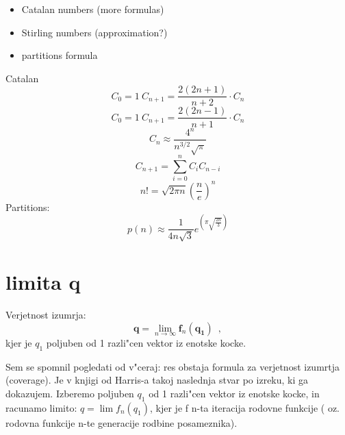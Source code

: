 \documentclass{article}
\begin{document}
    \begin{itemize}	
        \item Catalan numbers (more formulas)
        \item Stirling numbers  (approximation?)
        \item partitions formula 
    \end{itemize}	
   Catalan \\
   \[ C_0 = 1 \ C_{n+1} = \frac{2(2n+1)}{n+2} \cdot C_{n} \]
   \[ C_0 = 1 \ C_{n+1} = \frac{2(2n-1)}{n+1} \cdot C_{n} \]
   \[ C_n \approx \frac{4^n}{n^{3/2}\sqrt{\pi}} \]
   \[ C_{n+1} = \sum_{i=0}^{n} C_i C_{n-i} \]
   \[ n! =  \sqrt{2\pi n} (\frac{n}{e})^n  \]
   Partitions:\\
    \[ p(n) \approx 
     \frac{1}{4n\sqrt{3}}
      e^{(\pi \sqrt{\frac{2n}{3}})} \]
   

   \section{limita q}
   Verjetnost izumrja: \\
   \[ \mathbf{q} = \lim_{n\to\infty} \mathbf{f}_{n}(\mathbf{q_1}) \enspace , \]
   kjer je $q_1$ poljuben od 1 razli"cen vektor iz enotske kocke.
   

   Sem se spomnil pogledati od v"ceraj: res obstaja formula za verjetnost izumrtja 
   (coverage). Je v knjigi od Harris-a takoj naslednja stvar po izreku, ki ga dokazujem.
   Izberemo poljuben $q_1$ od 1 razli"cen vektor iz enotske kocke, in racunamo limito:
    $ q = \lim f_n(q_1) $, kjer je f n-ta iteracija rodovne funkcije
   ( oz. rodovna funkcije n-te generacije rodbine posameznika).
   
\end{document}
